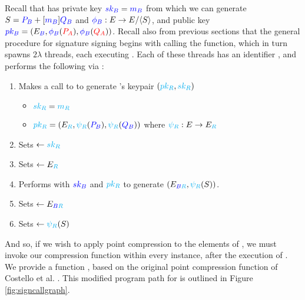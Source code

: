 Recall that \bob has private key $\textcolor{blue}{sk_B} = \textcolor{blue}{m_B}$ from which we can generate $S = \textcolor{blue}{P_B} + [\textcolor{blue}{m_B}]\textcolor{blue}{Q_B}$ and $\textcolor{blue}{\phi_B}: E \rightarrow E/\langle S \rangle$, and public key $\textcolor{blue}{pk_B} = (E_{\textcolor{blue}{B}}, \textcolor{blue}{\phi_B}(\textcolor{red}{P_A}), \textcolor{blue}{\phi_B}(\textcolor{red}{Q_A}))$. Recall also from previous sections that the general procedure for signature signing begins with \bob calling the  function, which in turn spawns $2\lambda$ threads, each executing . Each of these threads has an identifier , and performs the following via :
\begin{enumerate}
\item Makes a call to  to generate \randall's keypair $(\textcolor{cyan}{pk_R}, \textcolor{cyan}{sk_R})$
\begin{itemize}
\item $\textcolor{cyan}{sk_R} = \textcolor{cyan}{m_R}$
\item $\textcolor{cyan}{pk_R} = (E_{\textcolor{cyan}{R}}, \textcolor{cyan}{\psi_R}(\textcolor{blue}{P_B}), \textcolor{cyan}{\psi_R}(\textcolor{blue}{Q_B}))$ where $\textcolor{cyan}{\psi_R}: E \rightarrow E_{\textcolor{cyan}{R}}$
\end{itemize}
\item Sets  $\gets \textcolor{cyan}{sk_R}$
\item Sets  $\gets E_{\textcolor{cyan}{R}}$
\item Performs  with $\textcolor{blue}{sk_B}$ and $\textcolor{cyan}{pk_R}$ to generate $(E_{\textcolor{blue}{B}\textcolor{cyan}{R}}, \textcolor{cyan}{\psi_R}(S))$.
\item Sets  $\gets E_{\textcolor{blue}{B}\textcolor{cyan}{R}}$
\item Sets  $\gets \textcolor{cyan}{\psi_R}(S)$
\end{enumerate}

And so, if we wish to apply point compression to the elements of , we must invoke our compression function within every  instance, after the execution of . We provide a function , based on the original point compression function of Costello et al. \cite{pkcomp}. This modified program path for  is outlined in Figure \ref{fig:signcallgraph}.

